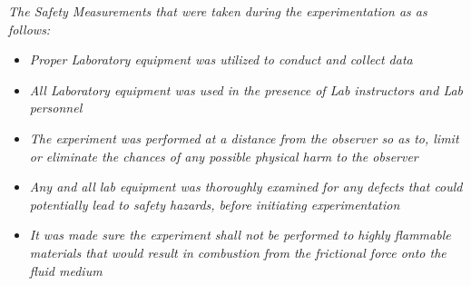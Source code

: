 

\textit{The Safety Measurements that were taken during the experimentation as as follows:}

	\begin{itemize}
		\item \textit{Proper Laboratory equipment was utilized to conduct and collect data}
		\item \textit{All Laboratory equipment was used in the presence of Lab instructors and Lab personnel}
		\item \textit{The experiment was performed at a distance from the observer so as to, limit or eliminate the chances of any possible physical harm to the observer}
		\item \textit{Any and all lab equipment was thoroughly examined for any defects that could potentially lead to safety hazards, before initiating experimentation}
		\item \textit{It was made sure the experiment shall not be performed to highly flammable materials that would result in combustion from the frictional force onto the fluid medium}
	\end{itemize}

